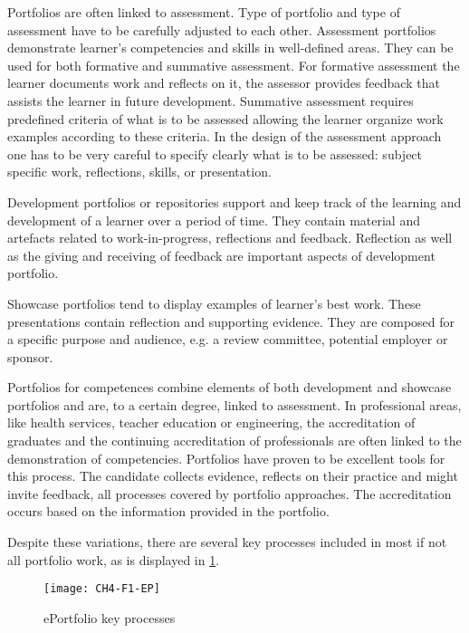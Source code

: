 Portfolios are often linked to assessment. Type of portfolio and type of
assessment have to be carefully adjusted to each other. Assessment portfolios
demonstrate learner's competencies and skills in well-defined areas. They can be
used for both formative and summative assessment. For formative assessment the
learner documents work and reflects on it, the assessor provides feedback that
assists the learner in future development. Summative assessment requires
predefined criteria of what is to be assessed allowing the learner organize work
examples according to these criteria. In the design of the assessment approach
one has to be very careful to specify clearly what is to be assessed: subject
specific work, reflections, \LLLs skills, or presentation.

Development portfolios or repositories support and keep track of the learning
and development of a learner over a period of time. They contain material and
artefacts related to work-in-progress, reflections and feedback. Reflection as
well as the giving and receiving of feedback are important aspects of
development portfolio.

Showcase portfolios tend to display examples of learner's best work. These
presentations contain reflection and supporting evidence. They are composed for
a specific purpose and audience, e.g. a review committee, potential employer or
sponsor.

Portfolios for competences combine elements of both development and showcase
portfolios and are, to a certain degree, linked to assessment. In professional
areas, like health services, teacher education or engineering, the accreditation
of graduates and the continuing accreditation of professionals are often linked
to the demonstration of competencies. Portfolios have proven to be excellent
tools for this process. The candidate collects evidence, reflects on their
practice and might invite feedback, all processes covered by portfolio
approaches. The accreditation occurs based on the information provided in the
portfolio.

Despite these variations, there are several key processes included in most if
not all portfolio work, as is displayed in \ref{fig:ep}.
 
\begin{figure}[htb]
\centering
\texttt{[image: CH4-F1-EP]}
\caption[ePortfolio key processes]{ePortfolio key processes \citep{Malloff2010}}
\label{fig:ep}
\end{figure}

